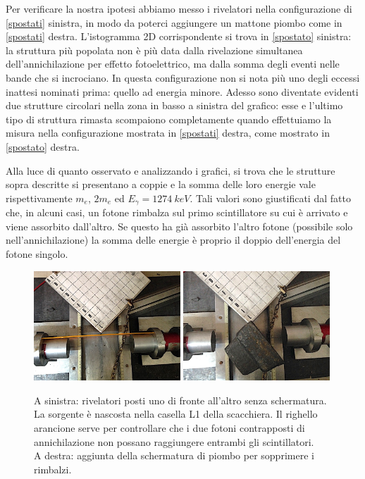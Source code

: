 Per verificare la nostra ipotesi abbiamo messo i rivelatori nella configurazione di \autoref{spostati} sinistra, in modo da poterci aggiungere un mattone piombo come in \autoref{spostati} destra.
L'istogramma 2D corrispondente si trova in \autoref{spostato} sinistra: la struttura più popolata non è più data dalla rivelazione simultanea dell'annichilazione per effetto fotoelettrico, ma dalla somma degli eventi nelle bande che si incrociano.
In questa configurazione non si nota più uno degli eccessi inattesi nominati prima: quello ad energia minore.
Adesso sono diventate evidenti due strutture circolari nella zona in basso a sinistra del grafico: esse e l'ultimo tipo di struttura rimasta scompaiono completamente quando effettuiamo la misura nella configurazione mostrata in \autoref{spostati} destra, come mostrato in \autoref{spostato} destra.

Alla luce di quanto osservato e analizzando i grafici, si trova che le strutture sopra descritte si presentano a coppie e la somma delle loro energie vale rispettivamente $m_e$, $2m_e$ ed $E_{\gamma}=\SI{1274}{keV}$.
Tali valori sono giustificati dal fatto che, in alcuni casi, un fotone rimbalza sul primo scintillatore su cui è arrivato e viene assorbito dall'altro. Se questo ha già assorbito l'altro fotone (possibile solo nell'annichilazione) la somma delle energie è proprio il doppio dell'energia del fotone singolo.

\begin{figure}[h]
\centering
\subfloat
{\includegraphics[width=0.49\textwidth]{immagini/alter}}
\hfill
\subfloat
{\includegraphics[width=0.49\textwidth]{immagini/spostati2}}
\caption{
A sinistra:
rivelatori posti uno di fronte all'altro senza schermatura.
La sorgente è nascosta nella casella L1 della scacchiera.
Il righello arancione serve per controllare che i due fotoni contrapposti di annichilazione
non possano raggiungere entrambi gli scintillatori.\\
A destra: aggiunta della schermatura di piombo per sopprimere i rimbalzi.}
\label{spostati}
\end{figure}

